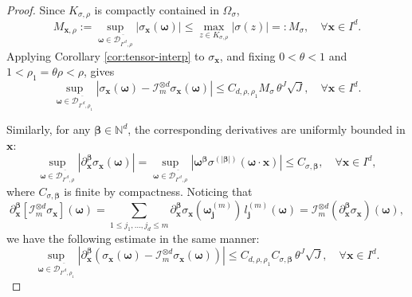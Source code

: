 \documentclass{article}
\numberwithin{equation}{section}
\def\NN{\mathbb{N}}
\def\RR{\mathbb{R}}
\def\lt{\left}
\def\rt{\right}
\def\bomega{{\bm\omega}}
\def\bbeta{{\bm\beta}}
\def\bx{{\bm x}}
\def\bj{{\bm j}}
\begin{document}
\begin{proof}
    
    Since $K_{\sigma,\rho}$ is compactly contained in $\Omega_\sigma$,
    \begin{equation}
            M_{\bx,\rho}:= \sup_{\bomega\in\overline{\mathcal{D}_{I'^d,\rho}}} |\sigma_\bx(\bomega)|
            \leq \max_{z\in K_{\sigma,\rho}}|\sigma(z)|=:M_\sigma,
            \quad\forall \bx\in I^d.
    \end{equation}
    Applying Corollary \ref{cor:tensor-interp} to $\sigma_\bx$, and fixing $0<\theta<1$ and $1<\rho_1=\theta\rho<\rho$, gives
    \begin{equation}
        \sup_{\bomega\in \overline{\mathcal{D}_{I'^d,\rho_1}}} |\sigma_\bx(\bomega)-\mathcal I_m^{\otimes d} \sigma_\bx(\bomega)|\leq C_{d,\rho,\rho_1} M_{\sigma}\,\theta^J \sqrt{J},\quad\forall \bx\in I^d.
    \end{equation}

    Similarly, for any $\bbeta\in\NN^d$, the corresponding derivatives are uniformly bounded in $\bx$:
    \begin{equation}
        \sup_{\bomega\in\overline{\mathcal{D}_{I'^d,\rho}}} |\partial_\bx^\bbeta \sigma_\bx(\bomega)|
        = \sup_{\bomega\in\overline{\mathcal{D}_{I'^d,\rho}}} |\bomega^\bbeta \sigma^{(|\bbeta|)}(\bomega\cdot\bx)|
        \leq C_{\sigma,\bbeta},\quad\forall \bx\in I^d,
    \end{equation}
    where $C_{\sigma,\bbeta}$ is finite by compactness. Noticing that 
    $$
    \partial_\bx^\bbeta \lt[\mathcal I_m^{\otimes d} \sigma_\bx \rt](\bomega) =\sum_{1\leq j_1,\ldots,j_d\leq m} \partial_\bx^\bbeta \sigma_\bx(\bomega_\bj^{(m)})\,l_\bj^{(m)}(\bomega)= \mathcal I_m^{\otimes d}(\partial_\bx^\bbeta \sigma_\bx)(\bomega),
    $$ 
    we have the following estimate in the same manner: 
    \begin{equation}
        \sup_{\bomega\in \overline{\mathcal{D}_{I'^d,\rho_1}}}|\partial_\bx^\bbeta(\sigma_\bx(\bomega)-\mathcal I_m^{\otimes d} \sigma_\bx(\bomega))|\leq C_{d,\rho,\rho_1} C_{\sigma,\bbeta}\,\theta^J\sqrt J,\quad\forall \bx\in I^d.
    \end{equation}
    

\end{proof}
\end{document}
